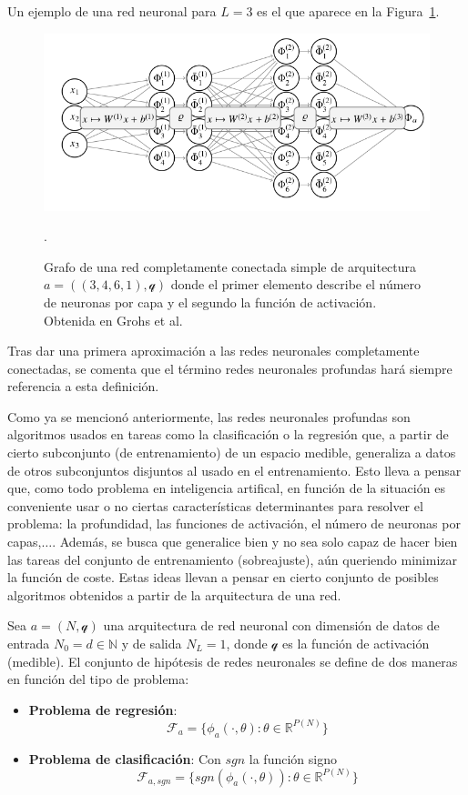 Un ejemplo de una red neuronal para \(L=3\) es el que aparece en la Figura~\ref{fig:img1}.

\begin{figure}[h]
\centering
\includegraphics[width=0.5\linewidth]{img/ejemplo_red.png}
\caption{Grafo de una red completamente conectada simple de arquitectura \(a=((3,4,6,1),\mathcal{q})\) donde el primer elemento describe el número de neuronas por capa y el segundo la función de activación. Obtenida en Grohs et al.\cite{matesModernasDL}}.
\label{fig:img1}
\end{figure}


Tras dar una primera aproximación a las redes neuronales completamente conectadas, se comenta que el término redes neuronales profundas hará siempre referencia a esta definición.

Como ya se mencionó anteriormente, las redes neuronales profundas son algoritmos usados en tareas como la clasificación o la regresión que, a partir de cierto subconjunto (de entrenamiento) de un espacio medible, generaliza a datos de otros subconjuntos disjuntos al usado en el entrenamiento. Esto lleva a pensar que, como todo problema en inteligencia artifical, en función de la situación es conveniente usar o no ciertas características determinantes para resolver el problema: la profundidad, las funciones de activación, el número de neuronas por capas,$\dots$. Además, se busca que generalice bien y no sea solo capaz de hacer bien las tareas del conjunto de entrenamiento (sobreajuste), aún queriendo minimizar la función de coste. Estas ideas llevan a pensar en cierto conjunto de posibles algoritmos obtenidos a partir de la arquitectura de una red.

\begin{definicion} 
Sea $a=(N,\mathcal{q})$ una arquitectura de red neuronal con dimensión de datos de entrada $N_0 = d \in \mathbb{N}$ y de salida $N_L=1$, donde $\mathcal{q}$ es la función de activación (medible). El conjunto de hipótesis de redes neuronales se define de dos maneras en función del tipo de problema:
\begin{itemize}
	\item \textbf{Problema de regresión}: $$\mathcal{F}_a = \{\phi_a(\text{·},\theta): \theta \in \mathbb{R}^{P(N)}\}$$
	\item \textbf{Problema de clasificación}: Con $sgn$ la función signo $$\mathcal{F}_{a,sgn} = \{sgn(\phi_a(\text{·},\theta)):\theta \in \mathbb{R}^{P(N)}\}$$
\end{itemize}
\end{definicion}

